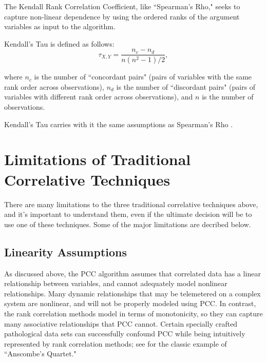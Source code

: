 The Kendall Rank Correlation Coefficient, like ``Spearman's Rho," seeks to capture non-linear dependence by using the ordered ranks of the argument variables as input to the algorithm.

Kendall's Tau is defined as follows:
\begin{equation} \label{eq:tau}
\tau_{X, Y} = \frac{n_{c} - n_{d}}{n(n^{2}-1)/2},
\end{equation}

where $n_{c}$ is the number of ``concordant pairs" (pairs of variables with the same rank order across observations), $n_{d}$ is the number of ``discordant pairs" (pairs of variables with different rank order across observations), and $n$ is the number of observations.

Kendall's Tau carries with it the same assumptions as Spearman's Rho \cite{kendalls2}.

\section{Limitations of Traditional Correlative Techniques}

There are many limitations to the three traditional correlative techniques above, and it's important to understand them, even if the ultimate decision will be to use one of these techniques. Some of the major limitations are decribed below.

\subsection{Linearity Assumptions}

As discussed above, the PCC algorithm assumes that correlated data has a linear relationship between variables, and cannot adequately model nonlinear relationships. Many dynamic relationships that may be telemetered on a complex system are nonlinear, and will not be properly modeled using PCC. In contrast, the rank correlation methods model in terms of monotonicity, so they can capture many associative relationships that PCC cannot. Certain specially crafted pathological data sets can successfully confound PCC while being intuitively represented by rank correlation methods; see \cite{anscombe1973graphs} for the classic example of ``Anscombe's Quartet."


